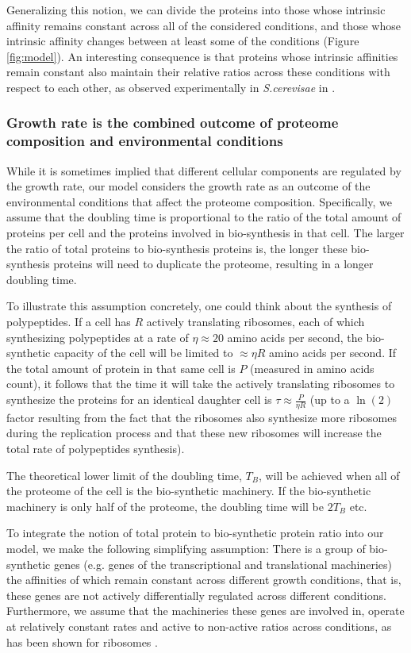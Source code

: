 \documentclass{article}
\begin{document}
Generalizing this notion, we can divide the proteins into those whose intrinsic affinity remains constant across all of the considered conditions, and those whose intrinsic affinity changes between at least some of the conditions (Figure \ref{fig:model}).
An interesting consequence is that proteins whose intrinsic affinities remain constant also maintain their relative ratios across these conditions with respect to each other, as observed experimentally in \emph{S.cerevisae} in \cite{Keren2013}.

\subsubsection{Growth rate is the combined outcome of proteome composition and environmental conditions}
While it is sometimes implied that different cellular components are regulated by the growth rate, our model considers the growth rate as an outcome of the environmental conditions that affect the proteome composition.
Specifically, we assume that the doubling time is proportional to the ratio of the total amount of proteins per cell and the proteins involved in bio-synthesis in that cell.
The larger the ratio of total proteins to bio-synthesis proteins is, the longer these bio-synthesis proteins will need to duplicate the proteome, resulting in a longer doubling time.

To illustrate this assumption concretely, one could think about the synthesis of polypeptides.
If a cell has $R$ actively translating ribosomes, each of which synthesizing polypeptides at a rate of $\eta \approx 20$ amino acids per second, the bio-synthetic capacity of the cell will be limited to $\approx \eta R$ amino acids per second.
If the total amount of protein in that same cell is $P$ (measured in amino acids count), it follows that the time it will take the actively translating ribosomes to synthesize the proteins for an identical daughter cell is $\tau \approx \frac{P}{\eta R}$ (up to a $\ln(2)$ factor resulting from the fact that the ribosomes also synthesize more ribosomes during the replication process and that these new ribosomes will increase the total rate of polypeptides synthesis).


The theoretical lower limit of the doubling time, $T_B$, will be achieved when all of the proteome of the cell is the bio-synthetic machinery.
If the bio-synthetic machinery is only half of the proteome, the doubling time will be $2T_B$ etc.

To integrate the notion of total protein to bio-synthetic protein ratio into our model, we make the following simplifying assumption:
There is a group of bio-synthetic genes (e.g. genes of the transcriptional and translational machineries) the affinities of which remain constant across different growth conditions, that is, these genes are not actively differentially regulated across different conditions.
Furthermore, we assume that the machineries these genes are involved in, operate at relatively constant rates and active to non-active ratios across conditions, as has been shown for ribosomes \cite{Bremer1987}.
\end{document}
